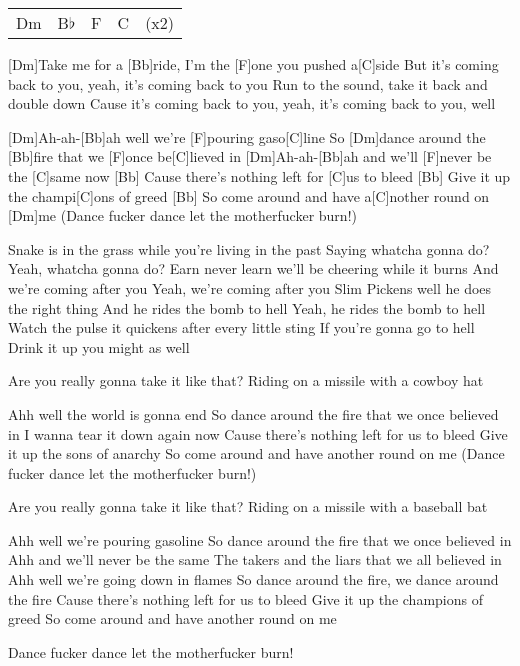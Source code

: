 

\begin{guitar}
	{\footnotesize\begin{tabular}{l|l|l|l l}
			Dm & B$\flat$ & F & C & (x2)
	\end{tabular}}
	
	[Dm]Take me for a [Bb]ride, I'm the [F]one you pushed a[C]side
	But it's coming back to you, yeah, it's coming back to you
	Run to the sound, take it back and double down
	Cause it's coming back to you, yeah, it's coming back to you, well
	
	[Dm]Ah-ah-[Bb]ah well we're [F]pouring gaso[C]line
	So [Dm]dance around the [Bb]fire that we [F]once be[C]lieved in
	[Dm]Ah-ah-[Bb]ah and we'll [F]never be the [C]same now
	[Bb] Cause there's nothing left for [C]us to bleed
	[Bb] Give it up the champi[C]ons of greed
	[Bb] So come around and have a[C]nother round on [Dm]me
	(Dance fucker dance let the motherfucker burn!)
	
	Snake is in the grass while you're living in the past
	Saying whatcha gonna do?
	Yeah, whatcha gonna do?
	Earn never learn we'll be cheering while it burns
	And we're coming after you
	Yeah, we're coming after you
	Slim Pickens well he does the right thing
	And he rides the bomb to hell
	Yeah, he rides the bomb to hell
	Watch the pulse it quickens after every little sting
	If you're gonna go to hell
	Drink it up you might as well
	
	Are you really gonna take it like that?
	Riding on a missile with a cowboy hat
	
	Ahh well the world is gonna end
	So dance around the fire that we once believed in
	I wanna tear it down again now
	Cause there's nothing left for us to bleed
	Give it up the sons of anarchy
	So come around and have another round on me
	(Dance fucker dance let the motherfucker burn!)
	
	
	Are you really gonna take it like that?
	Riding on a missile with a baseball bat
	
	Ahh well we're pouring gasoline
	So dance around the fire that we once believed in
	Ahh and we'll never be the same
	The takers and the liars that we all believed in
	Ahh well we're going down in flames
	So dance around the fire, we dance around the fire
	Cause there's nothing left for us to bleed
	Give it up the champions of greed
	So come around and have another round on me
	
	Dance fucker dance let the motherfucker burn!
\end{guitar}